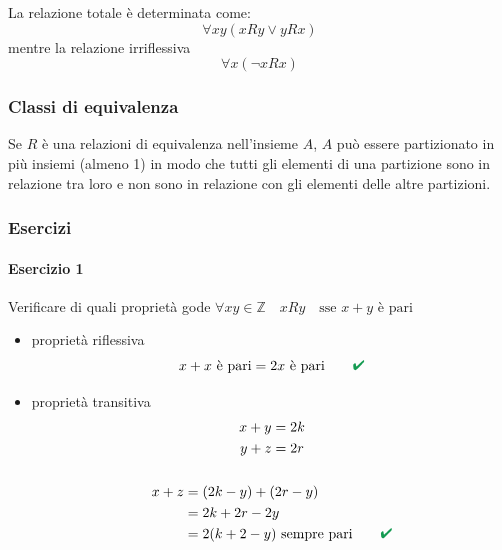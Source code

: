 \documentclass[italian]{article}
\renewcommand{\checkmark}{\textcolor{ForestGreen}{\text{$\qquad$\ding{52}}}}
\newcommand{\ins}[1]{\text{$\mathbb{#1}$}}
\begin{document}
\noindent La relazione totale è determinata come: \[\forall xy (xRy \lor yRx)\] mentre la relazione irriflessiva \[ \forall x (\lnot xRx) \]

\subsubsection{Classi di equivalenza}
Se $R$ è una relazioni di equivalenza nell'insieme $A$, $A$ può essere partizionato in più insiemi (almeno 1) in modo che tutti gli elementi di una partizione sono in relazione tra loro e non sono in relazione con gli elementi delle altre partizioni.

\subsubsection{Esercizi}

\paragraph{Esercizio 1}
Verificare di quali proprietà gode $\forall xy \in \ins{Z} \quad xRy \quad \text{sse } x+y \text{ è pari}$
\begin{itemize}
	\item proprietà riflessiva
		\[
			x + x \text{ è pari} = 2x \text{ è pari} \checkmark
		\]
	\item proprietà transitiva
		\begin{gather*}
			x + y = 2k \\
			y+z = 2r \\\\
			\begin{split}
				x+z &= (2k - y) + (2r - y) \\
				&= 2k + 2r - 2y \\
				&= 2(k+2 - y) \text{ sempre pari} \checkmark
			\end{split}
		\end{gather*}
\end{itemize}
\end{document}
